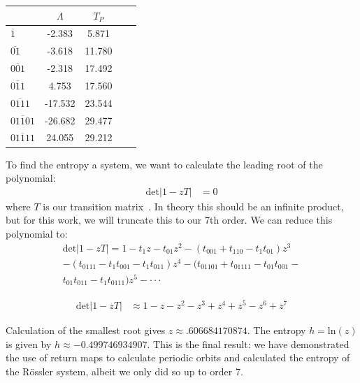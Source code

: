 \documentclass[10pt,letter]{article}
\begin{document}
\begin{center}
  \begin{tabular}{| l | c | c | c  | r| }
    \hline
     & $\Lambda$ & $T_P$ \\ \hline
    $\overline{1}$  & -2.383 & 5.871\\ \hline
    $\overline{01}$ &  -3.618 & 11.780 \\ \hline
    $\overline{001}$ &  -2.318 & 17.492 \\ \hline
    $\overline{011}$ & 4.753 & 17.560  \\ \hline
    $\overline{0111}$ &  -17.532 & 23.544 \\ \hline
    $\overline{01101}$ &  -26.682 & 29.477 \\ \hline
    $\overline{01111}$ & 24.055 & 29.212 \\ \hline
  \end{tabular}
  \label{Tab:Eigenvales}
\end{center}

To find the entropy a system, we want to calculate the leading root of
the polynomial:
\begin{equation}
\begin{split}
\text{det}|1-zT| &=0
\end{split}
\end{equation}
where $T$ is our transition matrix~\cite{CB}. In theory this should be an
infinite product, but for this work, we will truncate this to our 7th
order.  We can reduce this polynomial to:
\begin{equation}
\begin{split}
\text{det}|1-zT| = 1 - t_{1}z - t_{01}z^2 - (t_{001} + t_{110} - t_{1}t_{01})z^3 \\ -(t_{0111} -t_{1}t_{001}-t_{1}t_{011})z^4  -(t_{01101}+t_{01111}-t_{01}t_{001}- \\ t_{01}t_{011}-t_{1}t_{0111})z^5 - \cdot \cdot \cdot
\end{split}
\end{equation}

\begin{equation}
\begin{split}
\text{det}|1-zT| &\approx 1 - z -z^2 - z^3 +z^4+z^5-z^6+z^7
\end{split}
\end{equation}

Calculation of the smallest root gives $z \approx .606684170874$.  The
entropy $h = \text{ln}(z)$ is given by $h \approx -0.499746934907$.
This is the final result: we have demonstrated the use of return maps to
calculate periodic orbits and calculated the entropy of the R\"ossler
system, albeit we only did so up to order 7.
\end{document}
